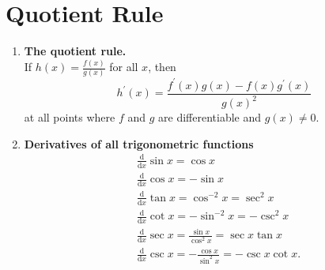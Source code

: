 \section{Quotient Rule}
\begin{enumerate}
    \item \textbf{The quotient rule.}\\
        \indent If \(h(x)=\frac{f(x)}{g(x)}\) for all \(x\), then
        \[
            h^\prime (x)=\frac{f^\prime (x)g(x)-f(x)g^\prime (x)}{g(x)^2}
        \]
        at all points where \(f\) and \(g\) are differentiable and \(g(x)\neq 0\).
    \item \textbf{Derivatives of all trigonometric functions}
        \begin{align*}
            & \frac{\mathrm{d}}{\mathrm{d}x}\sin x=\cos x\\
            & \frac{\mathrm{d}}{\mathrm{d}x}\cos x=-\sin x\\
            & \frac{\mathrm{d}}{\mathrm{d}x}\tan x=\cos^{-2}x=\sec^2 x\\
            & \frac{\mathrm{d}}{\mathrm{d}x}\cot x=-\sin^{-2}x=-\csc^2 x\\
            & \frac{\mathrm{d}}{\mathrm{d}x}\sec x=\frac{\sin x}{\cos^2 x}=\sec x\tan x\\
            & \frac{\mathrm{d}}{\mathrm{d}x}\csc x=-\frac{\cos x}{\sin^2 x}=-\csc x\cot x.
        \end{align*}
\end{enumerate}

